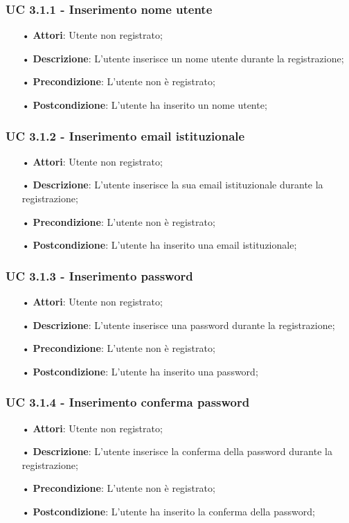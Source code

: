 \subsubsection{UC 3.1.1 - Inserimento nome utente}
\begin{itemize}
	\item[•]\textbf{Attori}: Utente non registrato;
	\item[•]\textbf{Descrizione}: L’utente inserisce un nome utente durante la registrazione;
	\item[•]\textbf{Precondizione}: L’utente non è registrato;
	\item[•]\textbf{Postcondizione}: L’utente ha inserito un nome utente;
\end{itemize}

\subsubsection{UC 3.1.2 - Inserimento email istituzionale}
\begin{itemize}
	\item[•]\textbf{Attori}: Utente non registrato;
	\item[•]\textbf{Descrizione}: L’utente inserisce la sua email istituzionale durante la registrazione;
	\item[•]\textbf{Precondizione}: L’utente non è registrato;
	\item[•]\textbf{Postcondizione}: L’utente ha inserito una email istituzionale;
\end{itemize}

\subsubsection{UC 3.1.3 - Inserimento password}
\begin{itemize}
	\item[•]\textbf{Attori}: Utente non registrato;
	\item[•]\textbf{Descrizione}: L’utente inserisce una password durante la registrazione;
	\item[•]\textbf{Precondizione}: L’utente non è registrato;
	\item[•]\textbf{Postcondizione}: L’utente ha inserito una password;
\end{itemize}

\subsubsection{UC 3.1.4 - Inserimento conferma password}
\begin{itemize}
	\item[•]\textbf{Attori}: Utente non registrato;
	\item[•]\textbf{Descrizione}: L’utente inserisce la conferma della password durante la registrazione;
	\item[•]\textbf{Precondizione}: L’utente non è registrato;
	\item[•]\textbf{Postcondizione}: L’utente ha inserito la conferma della password;
\end{itemize}

